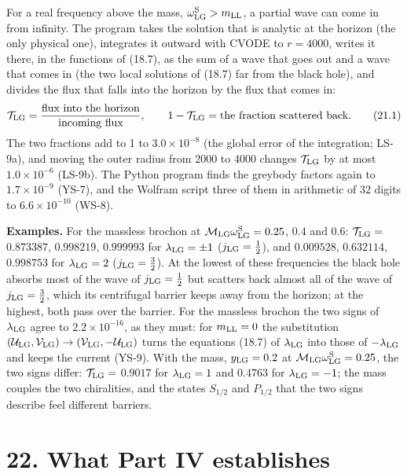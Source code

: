 \documentclass[
  10pt,
]{article}
\begin{document}
For a real frequency above the mass,
\(\omega^{\rm S}_{\rm LG}>m_{\rm LL}\), a partial wave can come in from
infinity. The program takes the solution that is analytic at the horizon
(the only physical one), integrates it outward with CVODE to \(r=4000\),
writes it there, in the functions of (18.7), as the sum of a wave that
goes out and a wave that comes in (the two local solutions of (18.7) far
from the black hole), and divides the flux that falls into the horizon
by the flux that comes in:
\[\mathcal T_{\rm LG}=\frac{\text{flux into the horizon}}{\text{incoming flux}},\qquad1-\mathcal T_{\rm LG}=\text{the fraction scattered back}.\tag{21.1}\]
The two fractions add to 1 to \(3.0\times10^{-8}\) (the global error of
the integration; LS-9a), and moving the outer radius from 2000 to 4000
changes \(\mathcal T_{\rm LG}\) by at most \(1.0\times10^{-6}\) (LS-9b).
The Python program finds the greybody factors again to
\(1.7\times10^{-9}\) (YS-7), and the Wolfram script three of them in
arithmetic of 32 digits to \(6.6\times10^{-10}\) (WS-8).

\textbf{Examples.} For the massless brochon at
\(\mathcal M_{\rm LG}\omega^{\rm S}_{\rm LG}=0.25\), \(0.4\) and
\(0.6\): \(\mathcal T_{\rm LG}=\) \(0.873387\), \(0.998219\),
\(0.999993\) for \(\lambda_{\rm LG}=\pm1\) (\(j_{\rm LG}=\tfrac12\)),
and \(0.009528\), \(0.632114\), \(0.998753\) for \(\lambda_{\rm LG}=2\)
(\(j_{\rm LG}=\tfrac32\)). At the lowest of these frequencies the black
hole absorbs most of the wave of \(j_{\rm LG}=\tfrac12\) but scatters
back almost all of the wave of \(j_{\rm LG}=\tfrac32\), which its
centrifugal barrier keeps away from the horizon; at the highest, both
pass over the barrier. For the massless brochon the two signs of
\(\lambda_{\rm LG}\) agree to \(2.2\times10^{-16}\), as they must: for
\(m_{\rm LL}=0\) the substitution
\((\mathcal U_{\rm LG},\mathcal V_{\rm LG})\to(\mathcal V_{\rm LG},-\mathcal U_{\rm LG})\)
turns the equations (18.7) of \(\lambda_{\rm LG}\) into those of
\(-\lambda_{\rm LG}\) and keeps the current (YS-9). With the mass,
\(y_{\rm LG}=0.2\) at
\(\mathcal M_{\rm LG}\omega^{\rm S}_{\rm LG}=0.25\), the two signs
differ: \(\mathcal T_{\rm LG}=\) \(0.9017\) for \(\lambda_{\rm LG}=1\)
and \(0.4763\) for \(\lambda_{\rm LG}=-1\); the mass couples the two
chiralities, and the states \(S_{1/2}\) and \(P_{1/2}\) that the two
signs describe feel different barriers.

\hypertarget{what-part-iv-establishes}{%
\section{22. What Part IV establishes}\label{what-part-iv-establishes}}
\end{document}
